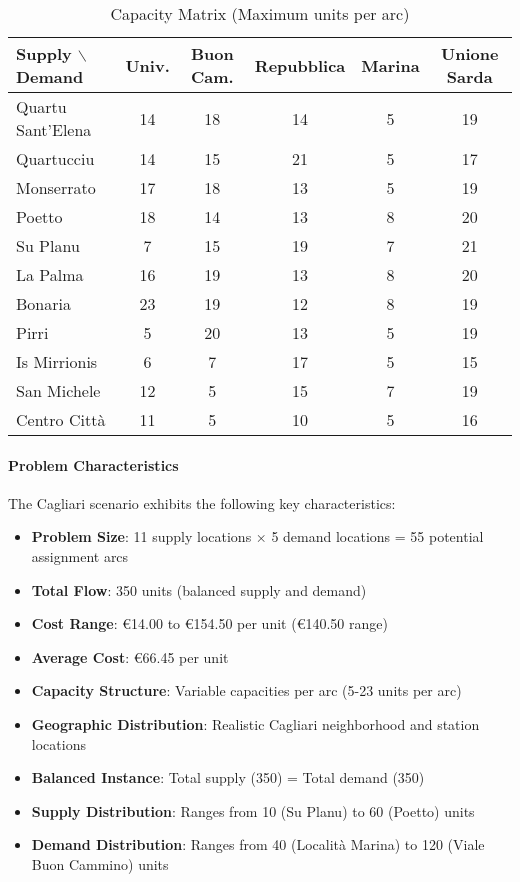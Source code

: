 \documentclass[12pt,a4paper]{article}
\begin{document}
\begin{table}[H]
\centering
\caption{Capacity Matrix (Maximum units per arc)}
\label{tab:capacity_matrix}
\footnotesize
\begin{tabular}{@{}l|ccccc@{}}
\toprule
\textbf{Supply $\backslash$ Demand} & \textbf{Univ.} & \textbf{Buon Cam.} & \textbf{Repubblica} & \textbf{Marina} & \textbf{Unione Sarda} \\
\midrule
Quartu Sant'Elena & 14 & 18 & 14 & 5 & 19 \\
Quartucciu & 14 & 15 & 21 & 5 & 17 \\
Monserrato & 17 & 18 & 13 & 5 & 19 \\
Poetto & 18 & 14 & 13 & 8 & 20 \\
Su Planu & 7 & 15 & 19 & 7 & 21 \\
La Palma & 16 & 19 & 13 & 8 & 20 \\
Bonaria & 23 & 19 & 12 & 8 & 19 \\
Pirri & 5 & 20 & 13 & 5 & 19 \\
Is Mirrionis & 6 & 7 & 17 & 5 & 15 \\
San Michele & 12 & 5 & 15 & 7 & 19 \\
Centro Città & 11 & 5 & 10 & 5 & 16 \\
\bottomrule
\end{tabular}
\end{table}

\paragraph{Problem Characteristics}
The Cagliari scenario exhibits the following key characteristics:

\begin{itemize}
\item \textbf{Problem Size}: 11 supply locations × 5 demand locations = 55 potential assignment arcs
\item \textbf{Total Flow}: 350 units (balanced supply and demand)
\item \textbf{Cost Range}: €14.00 to €154.50 per unit (€140.50 range)
\item \textbf{Average Cost}: €66.45 per unit
\item \textbf{Capacity Structure}: Variable capacities per arc (5-23 units per arc)
\item \textbf{Geographic Distribution}: Realistic Cagliari neighborhood and station locations
\item \textbf{Balanced Instance}: Total supply (350) = Total demand (350)
\item \textbf{Supply Distribution}: Ranges from 10 (Su Planu) to 60 (Poetto) units
\item \textbf{Demand Distribution}: Ranges from 40 (Località Marina) to 120 (Viale Buon Cammino) units
\end{itemize}
\end{document}
